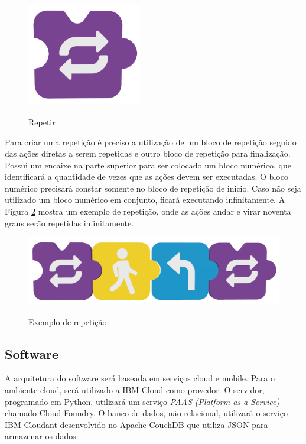         \begin{figure}[H]
            \caption{Repetir}
            \centering
            \includegraphics[width=5cm]{Imagens/Cap3/Blocos/Repetir.png}
            \label{figura:repetir}
        \end{figure}
        
        Para criar uma repetição é preciso a utilização de um bloco de repetição seguido das ações diretas a serem repetidas e outro bloco de repetição para finalização. Possui um encaixe na parte superior para ser colocado um bloco numérico, que identificará a quantidade de vezes que as ações devem ser executadas. O bloco numérico precisará constar somente no bloco de repetição de inicio. Caso não seja utilizado um bloco numérico em conjunto, ficará executando infinitamente. A Figura \ref{figura:exemplo_repeticao} mostra um exemplo de repetição, onde as ações andar e virar noventa graus serão repetidas infinitamente.
        
        \begin{figure}[H]
            \caption{Exemplo de repetição}
            \centering
            \includegraphics[width=\linewidth]{Imagens/Cap3/Blocos/Exemplo_Repeticao.png}
            \label{figura:exemplo_repeticao}
        \end{figure}
    
    \subsection{Software}
    A arquitetura do software será baseada em serviços cloud e mobile. Para o ambiente cloud, será utilizado a IBM Cloud como provedor.
    O servidor, programado em Python, utilizará um serviço \textit{PAAS (Platform as a Service)} chamado Cloud Foundry. O banco de dados, não relacional, utilizará o serviço IBM Cloudant desenvolvido no Apache CouchDB que utiliza JSON para armazenar os dados.
    
